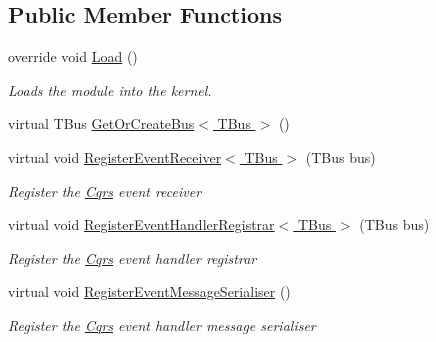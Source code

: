 \subsection*{Public Member Functions}
\begin{DoxyCompactItemize}
\item 
override void \hyperlink{classCqrs_1_1Ninject_1_1Azure_1_1ServiceBus_1_1EventBus_1_1Configuration_1_1AzureEventBusReceiverModule_a806a400a3eec26d81ab200a425ef6121_a806a400a3eec26d81ab200a425ef6121}{Load} ()
\begin{DoxyCompactList}\small\item\em Loads the module into the kernel. \end{DoxyCompactList}\item 
virtual T\+Bus \hyperlink{classCqrs_1_1Ninject_1_1Azure_1_1ServiceBus_1_1EventBus_1_1Configuration_1_1AzureEventBusReceiverModule_a421f5ac0599f0d3d5be569cc954be73b_a421f5ac0599f0d3d5be569cc954be73b}{Get\+Or\+Create\+Bus$<$ T\+Bus $>$} ()
\item 
virtual void \hyperlink{classCqrs_1_1Ninject_1_1Azure_1_1ServiceBus_1_1EventBus_1_1Configuration_1_1AzureEventBusReceiverModule_a67b8ec2c2762bf04c0568bead3d03cbf_a67b8ec2c2762bf04c0568bead3d03cbf}{Register\+Event\+Receiver$<$ T\+Bus $>$} (T\+Bus bus)
\begin{DoxyCompactList}\small\item\em Register the \hyperlink{namespaceCqrs}{Cqrs} event receiver \end{DoxyCompactList}\item 
virtual void \hyperlink{classCqrs_1_1Ninject_1_1Azure_1_1ServiceBus_1_1EventBus_1_1Configuration_1_1AzureEventBusReceiverModule_ab80bf02927363075fc0be6cd180a3398_ab80bf02927363075fc0be6cd180a3398}{Register\+Event\+Handler\+Registrar$<$ T\+Bus $>$} (T\+Bus bus)
\begin{DoxyCompactList}\small\item\em Register the \hyperlink{namespaceCqrs}{Cqrs} event handler registrar \end{DoxyCompactList}\item 
virtual void \hyperlink{classCqrs_1_1Ninject_1_1Azure_1_1ServiceBus_1_1EventBus_1_1Configuration_1_1AzureEventBusReceiverModule_a240eed04165b4f23ca27aee357d44b28_a240eed04165b4f23ca27aee357d44b28}{Register\+Event\+Message\+Serialiser} ()
\begin{DoxyCompactList}\small\item\em Register the \hyperlink{namespaceCqrs}{Cqrs} event handler message serialiser \end{DoxyCompactList}\end{DoxyCompactItemize}


